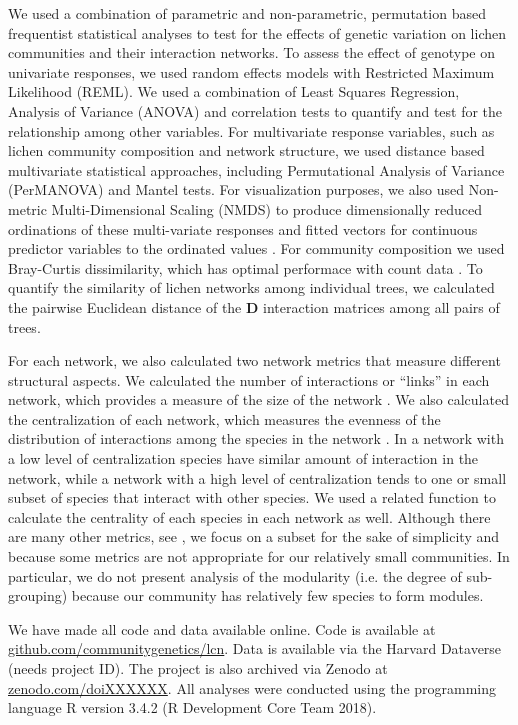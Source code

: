 \documentclass[9pt,twocolumn,twoside,lineno]{pnas-new}
\begin{document}
{We used a combination of parametric and non-parametric, permutation
based frequentist statistical analyses to test for the effects of
genetic variation on lichen communities and their interaction
networks. To assess the effect of genotype on univariate responses, we
used random effects models with Restricted Maximum Likelihood
(REML). We used a combination of Least Squares Regression, Analysis of
Variance (ANOVA) and correlation tests to quantify and test for the
relationship among other variables. For multivariate response
variables, such as lichen community composition and network structure,
we used distance based multivariate statistical approaches, including
Permutational Analysis of Variance (PerMANOVA) and Mantel tests. For
visualization purposes, we also used Non-metric Multi-Dimensional
Scaling (NMDS) \cite{ecodist} to produce dimensionally reduced
ordinations of these multi-variate responses and fitted vectors for
continuous predictor variables to the ordinated values
\cite{vegan}. For community composition we used Bray-Curtis
dissimilarity, which has optimal performace with count data
\citep{Minchen1998}. To quantify the similarity of lichen networks
among individual trees, we calculated the pairwise Euclidean distance
of the $\mathbf{D}$ interaction matrices among all pairs of trees.


For each network, we also calculated two network metrics that measure
different structural aspects. We calculated the number of interactions
or ``links'' in each network, which provides a measure of the size of
the network \citep{Lau2014, Borrett2015}. We also calculated the
centralization of each network, which measures the evenness of the
distribution of interactions among the species in the network
\cite{Butts2005}. In a network with a low level of centralization
species have similar amount of interaction in the network, while a
network with a high level of centralization tends to one or small
subset of species that interact with other species. We used a related
function to calculate the centrality of each species in each network
as well. Although there are many other metrics, see \citep{Lau2016},
we focus on a subset for the sake of simplicity and because some
metrics are not appropriate for our relatively small communities. In
particular, we do not present analysis of the modularity (i.e. the
degree of sub-grouping) because our community has relatively few
species to form modules.

We have made all code and data available online. Code is available at
\url{github.com/communitygenetics/lcn}. Data is available via the
Harvard Dataverse (needs project ID). The project is also archived via
Zenodo at \url{zenodo.com/doiXXXXXX}. All analyses were conducted
using the programming language R version 3.4.2 (R Development Core
Team 2018).

}
\end{document}
